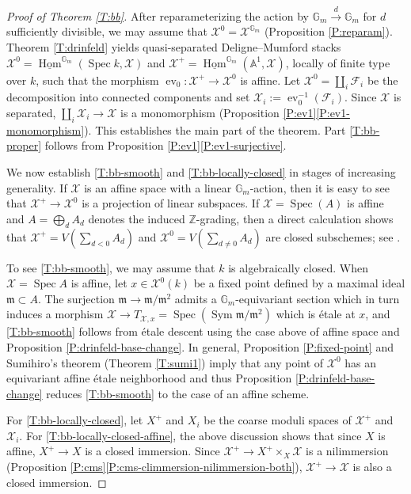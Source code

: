 \documentclass[a4paper]{amsart}
\theoremstyle{plain}
\theoremstyle{definition}
\theoremstyle{remark}
\numberwithin{equation}{section}
\newcommand{\fm}{\mathfrak{m}}
\newcommand{\GG}{\mathbb{G}}
\renewcommand\AA{\mathbb{A}}
\newcommand\ZZ{\mathbb{Z}}
\newcommand\cF{\mathcal{F}}
\newcommand\cX{\mathcal{X}}
\newcommand\co{\colon}
\DeclareMathOperator{\Spec}{Spec}
\DeclareMathOperator{\Sym}{Sym}
\DeclareMathOperator{\ev}{ev}
\DeclareMathOperator{\Hom}{Hom}
\begin{document}
\begin{proof}[Proof of Theorem \ref{T:bb}]
After reparameterizing the action by $\GG_m \xrightarrow{d} \GG_m$ for $d$ sufficiently divisible, we may assume that $\cX^0 = \cX^{\GG_m}$ (Proposition \ref{P:reparam}).  Theorem \ref{T:drinfeld} yields quasi-separated Deligne--Mumford stacks $\cX^0 =  \underline{\Hom}^{\GG_m}(\Spec k, \cX)$ and $\cX^+ = \underline{\Hom}^{\GG_m}(\AA^1,\cX)$, locally of finite type over $k$, such that the morphism $\ev_0 \co \cX^+ \to \cX^0$ is affine.  Let $\cX^0 = \coprod_i \cF_i$ be the decomposition into connected components and set $\cX_i := \ev_0^{-1}(\cF_i)$.  Since $\cX$ is separated, $\coprod_i \cX_i \to \cX$ is a monomorphism (Proposition \ref{P:ev1}\eqref{P:ev1-monomorphism}).  This establishes the main part of the theorem. Part \eqref{T:bb-proper} follows from Proposition \ref{P:ev1}\eqref{P:ev1-surjective}.

We now establish \eqref{T:bb-smooth} and \eqref{T:bb-locally-closed} in stages of increasing generality.  If $\cX$ is an affine space with a linear $\GG_m$-action, then it is easy to see that $\cX^+ \to \cX^0$ is a projection of linear subspaces.  If $\cX = \Spec(A)$ is affine and  $A = \bigoplus_{d} A_d$ denotes the induced $\ZZ$-grading, then a direct calculation shows that $\cX^+ = V(\sum_{d < 0} A_d)$ and $\cX^0 = V(\sum_{d \neq 0} A_d)$ are closed subschemes; see \cite[\S 1.3.4]{drinfeld}.

To see \eqref{T:bb-smooth}, we may assume that $k$ is algebraically closed.  When $\cX=\Spec A$ is affine, let $x \in \cX^0(k)$ be a fixed point defined by a maximal ideal $\fm \subset A$.  The surjection $\fm \to \fm/\fm^2$ admits a $\GG_m$-equivariant section which in turn induces a morphism $\cX \to T_{\cX,x} = \Spec(\Sym \fm/\fm^2)$ which is \'etale at $x$, and \eqref{T:bb-smooth} follows from  \'etale descent using the case above of affine space and Proposition \ref{P:drinfeld-base-change}.
In general, Proposition \ref{P:fixed-point} and Sumihiro's theorem (Theorem \ref{T:sumi1}) imply that any point of $\cX^0$ has an equivariant affine \'etale neighborhood and thus Proposition \ref{P:drinfeld-base-change} reduces \eqref{T:bb-smooth} to the case of an affine scheme.

For  \eqref{T:bb-locally-closed}, let $X^+$ and $X_i$ be the coarse moduli spaces of $\cX^+$ and $\cX_i$.  For \eqref{T:bb-locally-closed-affine}, the above discussion shows that since $X$ is affine, $X^+ \to X$ is a closed immersion. Since $\cX^+ \to  X^+ \times_{X} \cX$ is a nilimmersion (Proposition \ref{P:cms}\eqref{P:cms-climmersion-nilimmersion-both}), $\cX^+ \to \cX$ is also a closed immersion.  


\end{proof}
\end{document}
